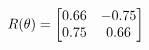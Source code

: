 \documentclass[preview]{standalone}
\begin{document}
\begin{align*}
\special{dvisvgm:raw <g id='unique000'>}R(\theta) = \begin{bmatrix}0.66 & -0.75\\0.75 & 0.66\end{bmatrix}\special{dvisvgm:raw </g>}
\end{align*}
\end{document}

